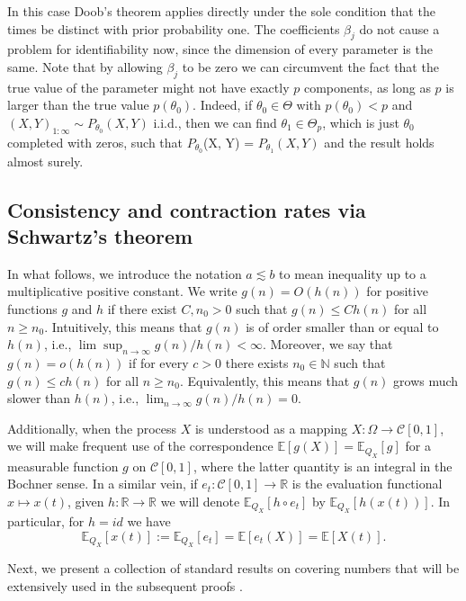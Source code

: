 In this case Doob's theorem applies directly under the sole condition that the times be distinct with prior probability one. The coefficients \(\beta_j\) do not cause a problem for identifiability now, since the dimension of every parameter is the same. Note that by allowing \(\beta_j\) to be zero we can circumvent the fact that the true value of the parameter might not have exactly \(p\) components, as long as \(p\) is larger than the true value \(p(\theta_0)\). Indeed, if \(\theta_0\in\Theta\) with \(p(\theta_0) < p\) and \((X,Y)_{1:\infty} \sim P_{\theta_0}(X,Y)\) i.i.d., then we can find \(\theta_1\in\Theta_p\), which is just \(\theta_0\) completed with zeros, such that \(P_{\theta_0}\)(X, Y) = \(P_{\theta_1}(X,Y)\) and the result holds almost surely.

\subsection{Consistency and contraction rates via Schwartz's theorem}

In what follows, we introduce the notation \(a\lesssim b\) to mean inequality up to a multiplicative positive constant. We write \(g(n)=O(h(n))\) for positive functions \(g\) and \(h\) if there exist \(C,n_0>0\) such that \(g(n)\leq Ch(n)\) for all \(n\geq n_0\). Intuitively, this means that \(g(n)\) is of order smaller than or equal to \(h(n)\), i.e., \(\lim\sup_{n\to\infty} g(n)/h(n) < \infty\). Moreover, we say that \(g(n)=o(h(n))\) if for every \(c>0\) there exists \(n_0\in\mathbb{N}\) such that \(g(n)\leq ch(n)\) for all \(n\geq n_0\). Equivalently, this means that \(g(n)\) grows much slower than \(h(n)\), i.e., \(\lim_{n\to\infty} g(n)/h(n) = 0\).

Additionally, when the process \(X\) is understood as a mapping \(X:\Omega \to \mathcal C[0,1]\), we will make frequent use of the correspondence \(\mathbb E[g(X)]=\mathbb E_{Q_X}[g]\) for a measurable function \(g\) on \(\mathcal C[0,1]\), where the latter quantity is an integral in the Bochner sense. In a similar vein, if \(e_t:\mathcal C[0,1]\to \mathbb R\) is the evaluation functional \(x\mapsto x(t)\), given \(h:\mathbb R \to \mathbb R\) we will denote \(\mathbb E_{Q_X}[h\circ e_t]\) by \(\mathbb E_{Q_X}[h(x(t))]\). In particular, for \(h=id\) we have
\[
  \mathbb E_{Q_X}[x(t)]:=\mathbb E_{Q_X}[e_t]=\mathbb E[e_t(X)]=\mathbb E[X(t)].
\]

Next, we present a collection of standard results on covering numbers that will be extensively used in the subsequent proofs \citep[see e.g.][]{van1996weak}.

